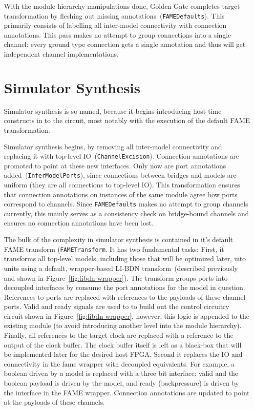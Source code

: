 With the module hierarchy manipulations done, Golden Gate completes target
transformation by fleshing out missing
annotations~(\texttt{FAMEDefaults}). This primarily consists of labelling
all inter-model connectivity with connection annotations. This pass makes no
attempt to group connections into a single channel: every ground type
connection gets a single annotation and thus will get independent channel
implementations.

\section{Simulator Synthesis}

Simulator synthesis is so named, because it begins introducing host-time constructs in to the circuit,
most notably with the execution of the default FAME transformation.

Simulator synthesis begins, by removing all inter-model connectivity and
replacing it with top-level IO~(\texttt{ChannelExcision}). Connection
annotations are promoted to point at these new interfaces. Only now are port
annotations added~(\texttt{InferModelPorts}), since connections between bridges
and models are uniform (they are all connections to top-level IO).  This
transformation ensures that connection annotations on instances of the same
module agree how ports correspond to channels. Since \texttt{FAMEDefaults}
makes no attempt to group channels currently, this mainly serves as a
consistency check on bridge-bound channels and ensures no connection
annotations have been lost.


The bulk of the complexity in simulator synthesis is contained in it's default
FAME transform (\texttt{FAMETransform}. It has two fundamental tasks: First, it
transforms all top-level models, including those that will be optimized later,
into units using a default, wrapper-based LI-BDN transform~(described
previously and shown in Figure~\ref{fig:libdn-wrapper}). The transform groups
ports into decoupled interfaces by consume the port annotations for the model
in question. References to ports are replaced with references to the payloads
of these channel ports. Valid and ready signals are used to to build out the
control circuitry circuit shown in Figure~\ref{fig:libdn-wrapper}, however,
this logic is appended to the existing module (to avoid introducing another
level into the module hierarchy). Finally, all references to the target clock
are replaced with a reference to the output of the clock buffer.  The clock
buffer itself is left as a black-box that will be implemented later for the
desired host FPGA.  Second it replaces the IO and connectivity in the fame wrapper with decoupled equivalents. For
example, a boolean driven by a model is replaced with a three bit interface:
valid and the boolean payload is driven by the model, and ready (backpressure)
is driven by the interface in the FAME wrapper. Connection annotations are
updated to point at the payloads of these channels.

